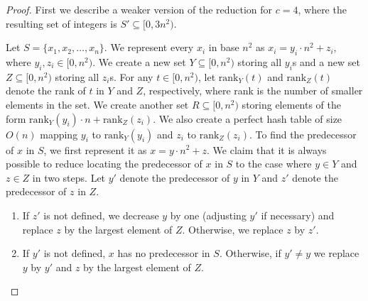 \documentclass{llncs}
\begin{document}
\begin{proof}
First we describe a weaker version of the reduction for $c=4$, where the resulting set of integers
is $S'\subseteq [0,3n^2)$.

Let $S=\{x_{1},x_{2},\ldots,x_{n}\}$. We represent every $x_{i}$ in base $n^{2}$ as $x_{i}=y_{i}\cdot n^{2}+z_{i}$, where
$y_{i},z_{i}\in [0,n^{2})$. We create a new set $Y \subseteq [0,n^{2})$ storing all $y_{i}$s and
a new set $Z\subseteq [0,n^2)$ storing all $z_{i}$s. For any $t\in [0,n^{2})$, let
$\text{rank}_{Y}(t)$ and $\text{rank}_{Z}(t)$ denote the rank of $t$ in $Y$ and $Z$, respectively,
where rank is the number of smaller elements in the set.
We create another set $R\subseteq [0,n^{2})$ storing 
elements of the form $\text{rank}_Y(y_{i})\cdot n+\text{rank}_Z(z_{i})$.
We also create a perfect hash table of size $O(n)$ mapping $y_{i}$ to $\text{rank}_{Y}(y_{i})$
and $z_{i}$ to $\text{rank}_{Z}(z_{i})$.
To find the predecessor of $x$ in $S$, we first represent it as $x=y\cdot n^2+z$.
We claim that it is always possible to reduce locating the predecessor
of $x$ in $S$ to the case where $y\in Y$ and $z\in Z$ in two steps.
Let $y'$ denote the predecessor of $y$ in $Y$ and $z'$ denote the predecessor of $z$ in $Z$.

\begin{enumerate}
\item If $z'$ is not defined, we decrease $y$ by one (adjusting $y'$ if necessary)
and replace $z$ by the largest element of $Z$. Otherwise, we replace $z$ by $z'$.
\item If $y'$ is not defined, $x$ has no predecessor in $S$. Otherwise, if $y' \neq y$ we replace
$y$ by $y'$ and $z$ by the largest element of $Z$.
\end{enumerate}


\end{proof}
\end{document}
